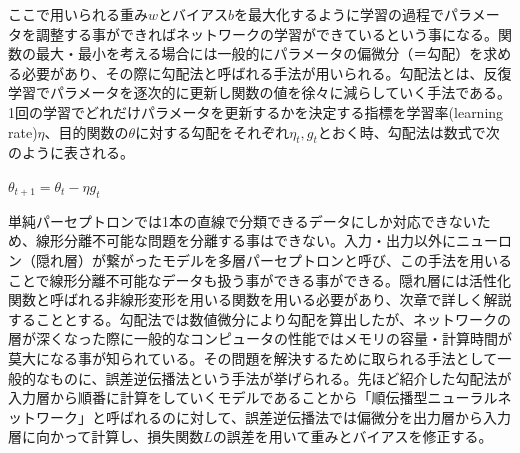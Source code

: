 \documentclass{article}
\begin{document}
ここで用いられる重み\begin{math}w\end{math}とバイアス\begin{math}b\end{math}を最大化するように学習の過程でパラメータを調整する事ができればネットワークの学習ができているという事になる。関数の最大・最小を考える場合には一般的にパラメータの偏微分（＝勾配）を求める必要があり、その際に勾配法と呼ばれる手法が用いられる。勾配法とは、反復学習でパラメータを逐次的に更新し関数の値を徐々に減らしていく手法である。1回の学習でどれだけパラメータを更新するかを決定する指標を学習率(learning rate)\begin{math}\eta\end{math}、目的関数の\begin{math}\theta\end{math}に対する勾配をそれぞれ\begin{math}\eta_t,g_t\end{math}とおく時、勾配法は数式で次のように表される。

\begin{center}
\begin{math}
\theta_{t+1} = \theta_t - \eta g_t
\end{math}
\end{center}

単純パーセプトロンでは1本の直線で分類できるデータにしか対応できないため、線形分離不可能な問題を分離する事はできない。入力・出力以外にニューロン（隠れ層）が繋がったモデルを多層パーセプトロンと呼び、この手法を用いることで線形分離不可能なデータも扱う事ができる事ができる。隠れ層には活性化関数と呼ばれる非線形変形を用いる関数を用いる必要があり、次章で詳しく解説することとする。勾配法では数値微分により勾配を算出したが、ネットワークの層が深くなった際に一般的なコンピュータの性能ではメモリの容量・計算時間が莫大になる事が知られている。その問題を解決するために取られる手法として一般的なものに、誤差逆伝播法という手法が挙げられる。先ほど紹介した勾配法が入力層から順番に計算をしていくモデルであることから「順伝播型ニューラルネットワーク」と呼ばれるのに対して、誤差逆伝播法では偏微分を出力層から入力層に向かって計算し、損失関数\begin{math}L\end{math}の誤差を用いて重みとバイアスを修正する。

\end{document}
